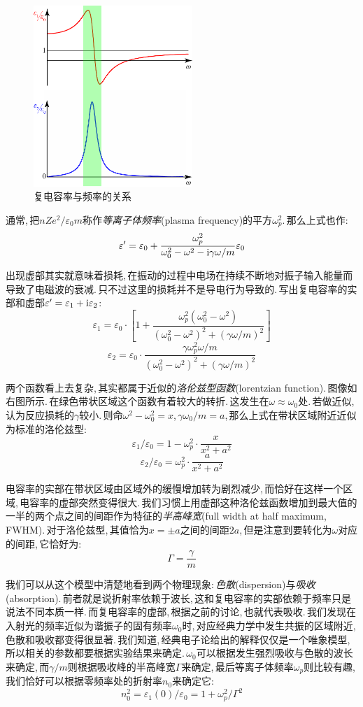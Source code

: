 \begin{figure}
\centering
\vspace{-15pt}
\includegraphics[width=6cm]{image/18-1-1.png}
\caption{复电容率与频率的关系}
\end{figure}
通常,\,把$nZe^2/\varepsilon_0 m$称作\emph{等离子体频率}(plasma frequency)的平方$\omega_p^2$.\,那么上式也作:
\[\varepsilon'=\varepsilon_0+\frac{\omega_p^2}{\omega_0^2-\omega^2-{\rm i}\gamma\omega/m}\varepsilon_0\]

出现虚部其实就意味着损耗,\,在振动的过程中电场在持续不断地对振子输入能量而导致了电磁波的衰减.\,只不过这里的损耗并不是导电行为导致的.\,写出复电容率的实部和虚部$\varepsilon'=\varepsilon_1+{\rm i}\varepsilon_2$:
\[\varepsilon_1=\varepsilon_0\cdot\left[1+\frac{\omega_p^2(\omega_0^2-\omega^2)}{(\omega_0^2-\omega^2)^2+(\gamma\omega/m)^2}\right]\]
\[\varepsilon_2=\varepsilon_0\cdot\frac{\gamma\omega_p^2\omega/m}{(\omega_0^2-\omega^2)^2+(\gamma\omega/m)^2}\]

两个函数看上去复杂,\,其实都属于近似的\emph{洛伦兹型函数}(lorentzian function).\,图像如右图所示.\,在绿色带状区域这个函数有着较大的转折.\,这发生在$\omega\approx \omega_0$处.\,若做近似,\,认为反应损耗的$\gamma$较小.\,则命$\omega^2-\omega_0^2=x$,\,$\gamma\omega_0/m=a$,\,那么上式在带状区域附近近似为标准的洛伦兹型:
\[\varepsilon_1/\varepsilon_0=1-\omega_p^2\cdot \frac{x}{x^2+a^2}\]
\[\varepsilon_2/\varepsilon_0=\omega_p^2\cdot\frac{a}{x^2+a^2}\]

电容率的实部在带状区域由区域外的缓慢增加转为剧烈减少,\,而恰好在这样一个区域,\,电容率的虚部突然变得很大.\,我们习惯上用虚部这种洛伦兹函数增加到最大值的一半的两个点之间的间距作为特征的\emph{半高峰宽}(full width at half maximum,\,FWHM).\,对于洛伦兹型,\,其值恰为$x=\pm a$之间的间距$2a$,\,但是注意到要转化为$\omega$对应的间距,\,它恰好为:
\[\Gamma=\frac{\gamma}{m}\]

我们可以从这个模型中清楚地看到两个物理现象:\,\emph{色散}(dispersion)与\emph{吸收}(absorption).\,前者就是说折射率依赖于波长,\,这和复电容率的实部依赖于频率只是说法不同本质一样.\,而复电容率的虚部,\,根据之前的讨论,\,也就代表吸收.\,我们发现在入射光的频率近似为谐振子的固有频率$\omega_0$时,\,对应经典力学中发生共振的区域附近,\,色散和吸收都变得很显著.\,我们知道,\,经典电子论给出的解释仅仅是一个唯象模型,\,所以相关的参数都要根据实验结果来确定.\,$\omega_0$可以根据发生强烈吸收与色散的波长来确定,\,而$\gamma/m$则根据吸收峰的半高峰宽$\Gamma$来确定,\,最后等离子体频率$\omega_p$则比较有趣,\,我们恰好可以根据零频率处的折射率$n_0$来确定它:
\[n_0^2=\varepsilon_1(0)/\varepsilon_0=1+\omega_p^2/\Gamma^2\]



